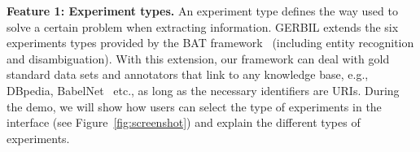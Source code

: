 \textbf{Feature 1: Experiment types.}
An experiment type defines the way used to solve a certain problem when extracting information.
GERBIL extends the six experiments types provided by the BAT framework~\cite{Cornolti} (including entity recognition and disambiguation). 
With this extension, our framework can deal with gold standard data sets and annotators that link to any knowledge base, e.g., DBpedia, BabelNet~\cite{NavigliPonzetto:12aij} etc., as long as the necessary identifiers are URIs. During the demo, we will show how users can select the type of experiments in the interface (see Figure~\ref{fig:screenshot}) and explain the different types of experiments.\newline


